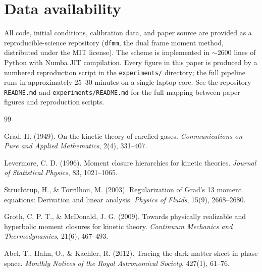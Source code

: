 \documentclass[11pt,letterpaper]{article}
\begin{document}
\section*{Data availability}

All code, initial conditions, calibration data, and paper source are
provided as a reproducible-science repository (\texttt{dfmm}, the
dual frame moment method, distributed under the MIT license). The scheme is implemented in
$\sim 2600$ lines of Python with Numba JIT compilation. Every figure in
this paper is produced by a numbered reproduction script in the
\texttt{experiments/} directory; the full pipeline runs in approximately
25--30 minutes on a single laptop core. See the repository
\texttt{README.md} and \texttt{experiments/README.md} for the full
mapping between paper figures and reproduction scripts.

\begin{thebibliography}{99}

Grad, H. (1949). On the kinetic theory of rarefied gases. \textit{Communications on Pure and Applied Mathematics}, 2(4), 331--407.

Levermore, C. D. (1996). Moment closure hierarchies for kinetic theories. \textit{Journal of Statistical Physics}, 83, 1021--1065.

Struchtrup, H., \& Torrilhon, M. (2003). Regularization of Grad's 13 moment equations: Derivation and linear analysis. \textit{Physics of Fluids}, 15(9), 2668--2680.

Groth, C. P. T., \& McDonald, J. G. (2009). Towards physically realizable and hyperbolic moment closures for kinetic theory. \textit{Continuum Mechanics and Thermodynamics}, 21(6), 467--493.

Abel, T., Hahn, O., \& Kaehler, R. (2012). Tracing the dark matter sheet in phase space. \textit{Monthly Notices of the Royal Astronomical Society}, 427(1), 61--76.

\end{thebibliography}
\end{document}
